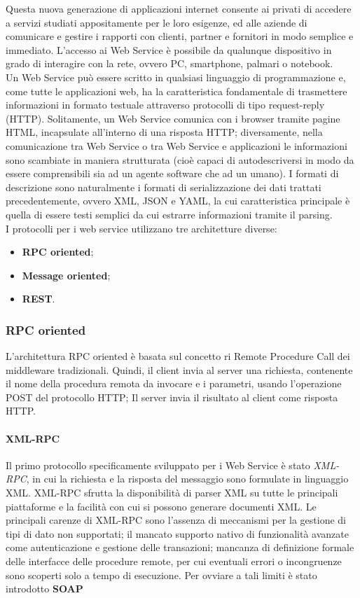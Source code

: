 Questa nuova generazione di applicazioni internet consente ai privati di accedere a servizi studiati appositamente per le loro esigenze, ed alle aziende di comunicare e gestire i rapporti con clienti, partner e fornitori in modo semplice e immediato.
L'accesso ai Web Service è possibile da qualunque dispositivo in grado di interagire con la rete, ovvero PC, smartphone, palmari o notebook.\\
Un Web Service può essere scritto in qualsiasi linguaggio di programmazione e, come tutte le applicazioni web, ha la caratteristica fondamentale di trasmettere informazioni in formato testuale attraverso protocolli di tipo request-reply (HTTP).
Solitamente, un Web Service comunica con i browser tramite pagine HTML, incapsulate all'interno di una risposta HTTP; diversamente, nella comunicazione tra Web Service o tra Web Service e applicazioni le informazioni sono scambiate in maniera strutturata (cioè capaci di autodescriversi in modo da essere comprensibili sia ad un agente software che ad un umano).
I formati di descrizione sono naturalmente i formati di serializzazione dei dati trattati precedentemente, ovvero XML, JSON e YAML, la cui caratteristica principale è quella di essere testi semplici da cui estrarre informazioni tramite il parsing.\\
I protocolli per i web service utilizzano tre architetture diverse:
\begin{itemize}
\item \textbf{RPC oriented};
\item \textbf{Message oriented};
\item \textbf{REST}.
\end{itemize}
\subsubsection{RPC oriented}
L'architettura RPC oriented è basata sul concetto ri Remote Procedure Call dei middleware tradizionali.
Quindi, il client invia al server una richiesta, contenente il nome della procedura remota da invocare e i parametri, usando l'operazione POST del protocollo HTTP; Il server invia il risultato al client come risposta HTTP.
\paragraph{XML-RPC}
Il primo protocollo specificamente sviluppato per i Web Service è stato \textit{XML-RPC}, in cui la richiesta e la risposta del messaggio sono formulate in linguaggio XML.
XML-RPC sfrutta la disponibilità di parser XML su tutte le principali piattaforme e la facilità con cui si possono generare documenti XML.
Le principali carenze di XML-RPC sono l'assenza di meccanismi per la gestione di tipi di dato non supportati; il mancato supporto nativo di funzionalità avanzate come autenticazione e gestione delle transazioni; mancanza di definizione formale delle interfacce delle procedure remote, per cui eventuali errori o incongruenze sono scoperti solo a tempo di esecuzione.
Per ovviare a tali limiti è stato introdotto \textbf{SOAP}
